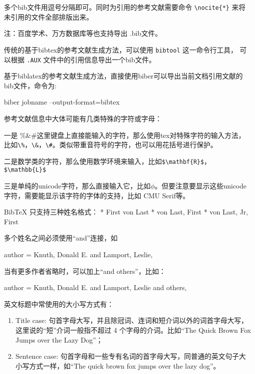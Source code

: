 多个bib文件用逗号分隔即可。同时为引用的参考文献需要命令 \verb|\nocite{*}| 来将未引用的文件全部排版出来。

注：百度学术、万方数据库等也支持导出 .bib文件。


传统的基于bibtex的参考文献生成方法，可以使用 \verb|bibtool| 这一命令行工具，
可以根据 \verb|.AUX| 文件中的引用信息导出一个bib文件。

基于biblatex的参考文献生成方法，直接使用biber可以导出当前文档引用文献的bib文件，命令为:

\begin{texlist}
biber jobname --output-format=bibtex
\end{texlist}




参考文献信息中大体可能有几类特殊的字符或字母：

一是 \%\&\#这里键盘上直接能输入的字符，那么使用tex对特殊字符的输入方法，比如\verb|\%|，\verb|\&|，\verb|\#|。类似带重音符号的字符，也可以用花括号进行保护。

二是数学类的字符，那么使用数学环境来输入，比如\verb|$\mathbf{R}$|，\verb|$\mathbb{L}$|

三是单纯的unicode字符，那么直接输入它，比如$\phi$。但要注意要显示这些unicode字符，需要能显示该字符的字体的支持，比如 CMU Serif等。



BibTeX 只支持三种姓名格式： * First von Last * von Last, First * von
Last, Jr, First

多个姓名之间必须使用``and''连接，如

\begin{texlist}
author = {Knuth, Donald E. and Lamport, Leslie},
\end{texlist}

当有更多作者省略时，可以加上“and others”，比如：

\begin{texlist}
author = {Knuth, Donald E. and Lamport, Leslie and others},
\end{texlist}



英文标题中常使用的大小写方式有：

\begin{enumerate}
\def\labelenumi{\arabic{enumi}.}

\item
  Title case:
  句首字母大写，并且除冠词、连词和短介词以外的词首字母大写，这里说的``短''介词一般指不超过
  4 个字母的介词。比如``The Quick Brown Fox Jumps over the Lazy Dog''；
\item
  Sentence case:
  句首字母和一些专有名词的首字母大写，同普通的英文句子大小写方式一样，如``The
  quick brown fox jumps over the lazy dog''。
\end{enumerate}

